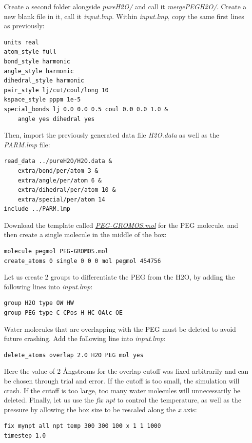 \documentclass[9pt,tutorial]{livecoms}
\begin{document}
Create a second folder alongside \textit{pureH2O/} and call it \textit{mergePEGH2O/}.
Create a new blank file in it, call it \textit{input.lmp}. Within \textit{input.lmp},
copy the same first lines as previously:
{\normalsize \begin{verbatim}
units real
atom_style full
bond_style harmonic
angle_style harmonic
dihedral_style harmonic
pair_style lj/cut/coul/long 10
kspace_style pppm 1e-5
special_bonds lj 0.0 0.0 0.5 coul 0.0 0.0 1.0 &
    angle yes dihedral yes
\end{verbatim}}
Then, import the previously generated data file \textit{H2O.data} as well as the \textit{PARM.lmp} file:
{\normalsize \begin{verbatim}
read_data ../pureH2O/H2O.data &
    extra/bond/per/atom 3 &
    extra/angle/per/atom 6 &
    extra/dihedral/per/atom 10 &
    extra/special/per/atom 14
include ../PARM.lmp
\end{verbatim}}
Download the template called
\href{https://raw.githubusercontent.com/lammpstutorials/lammpstutorials-article/main/files/tutorial3/PEG-GROMOS.mol}{\textit{PEG-GROMOS.mol}}
for the PEG molecule, and then create a single molecule in the middle of the box:
{\normalsize \begin{verbatim}
molecule pegmol PEG-GROMOS.mol
create_atoms 0 single 0 0 0 mol pegmol 454756
\end{verbatim}}
Let us create 2 groups to differentiate the PEG from the H2O, by adding the following
lines into \textit{input.lmp}:
{\normalsize \begin{verbatim}
group H2O type OW HW
group PEG type C CPos H HC OAlc OE
\end{verbatim}}
Water molecules that are overlapping with the PEG must be deleted to avoid future crashing.
Add the following line into \textit{input.lmp}:
{\normalsize \begin{verbatim}
delete_atoms overlap 2.0 H2O PEG mol yes
\end{verbatim}}
Here the value of 2 Ångstroms for the overlap cutoff was fixed arbitrarily and can
be chosen through trial and error. If the cutoff is too small, the simulation will
crash. If the cutoff is too large, too many water molecules will unnecessarily be
deleted. Finally, let us use the \textit{fix npt} to control the temperature, as
well as the pressure by allowing the box size to be rescaled along the \textit{x} axis:
{\normalsize \begin{verbatim}
fix mynpt all npt temp 300 300 100 x 1 1 1000
timestep 1.0
\end{verbatim}}
\end{document}
